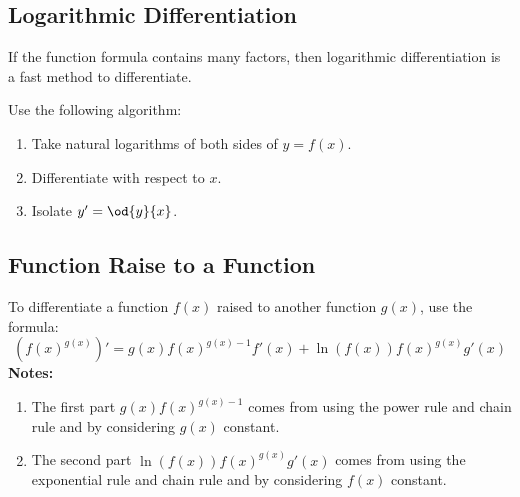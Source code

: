 \subsection{Logarithmic Differentiation}
	If the function formula contains many factors, then logarithmic differentiation is a fast method to differentiate.

	Use the following algorithm:
	\begin{enumerate}
		\item Take natural logarithms of both sides of $y=f(x)$.
		\item Differentiate with respect to $x$.
		\item Isolate $y' = \od{y}{x}$.
	\end{enumerate}
\subsection{Function Raise to a Function}
	To differentiate a function $f(x)$ raised to another function $g(x)$, use the formula:
	\[\left( f(x)^{g(x)} \right)' = g(x)f(x)^{g(x)-1} f'(x) + \ln(f(x))f(x)^{g(x)}g'(x)\]
	\textbf{Notes:}
	\begin{enumerate}
		\item The first part $g(x)f(x)^{g(x)-1}$ comes from using the power rule and chain rule and by considering $g(x)$ constant.
		\item The second part $\ln(f(x))f(x)^{g(x)}g'(x)$ comes from using the exponential rule and chain rule and by considering $f(x)$ constant.
	\end{enumerate}
